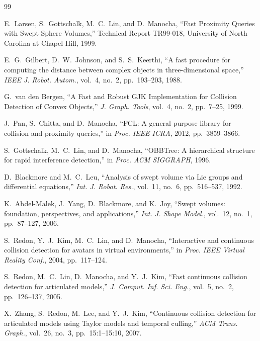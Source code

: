 \documentclass[11pt,a4paper]{article}
\begin{document}
\begin{thebibliography}{99}

E.~Larsen, S.~Gottschalk, M.~C.~Lin, and D.~Manocha,
``Fast Proximity Queries with Swept Sphere Volumes,''
Technical Report TR99-018, University of North Carolina at Chapel Hill, 1999.

E.~G.~Gilbert, D.~W.~Johnson, and S.~S.~Keerthi,
``A fast procedure for computing the distance between complex objects in
three-dimensional space,''
\textit{IEEE J. Robot. Autom.}, vol.~4, no.~2, pp.~193--203, 1988.

G.~van den Bergen,
``A Fast and Robust GJK Implementation for Collision Detection of Convex Objects,''
\textit{J. Graph. Tools}, vol.~4, no.~2, pp.~7--25, 1999.

J.~Pan, S.~Chitta, and D.~Manocha,
``FCL: A general purpose library for collision and proximity queries,''
in \textit{Proc. IEEE ICRA}, 2012, pp.~3859--3866.

S.~Gottschalk, M.~C.~Lin, and D.~Manocha,
``OBBTree: A hierarchical structure for rapid interference detection,''
in \textit{Proc. ACM SIGGRAPH}, 1996.

D.~Blackmore and M.~C.~Leu,
``Analysis of swept volume via Lie groups and differential equations,''
\textit{Int. J. Robot. Res.}, vol.~11, no.~6, pp.~516--537, 1992.

K.~Abdel-Malek, J.~Yang, D.~Blackmore, and K.~Joy,
``Swept volumes: foundation, perspectives, and applications,''
\textit{Int. J. Shape Model.}, vol.~12, no.~1, pp.~87--127, 2006.

S.~Redon, Y.~J.~Kim, M.~C.~Lin, and D.~Manocha,
``Interactive and continuous collision detection for avatars in virtual environments,''
in \textit{Proc. IEEE Virtual Reality Conf.}, 2004, pp.~117--124.

S.~Redon, M.~C.~Lin, D.~Manocha, and Y.~J.~Kim,
``Fast continuous collision detection for articulated models,''
\textit{J. Comput. Inf. Sci. Eng.}, vol.~5, no.~2, pp.~126--137, 2005.

X.~Zhang, S.~Redon, M.~Lee, and Y.~J.~Kim,
``Continuous collision detection for articulated models using Taylor models
and temporal culling,''
\textit{ACM Trans. Graph.}, vol.~26, no.~3, pp.~15:1--15:10, 2007.


\end{thebibliography}
\end{document}
